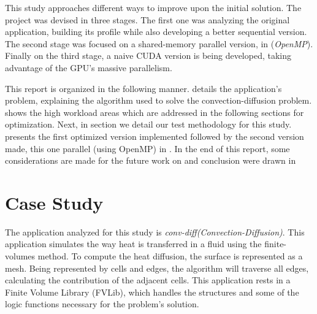 \documentclass[a4paper,10pt,openright,openbib,twocolumn]{article}
\begin{document}
This study approaches different ways to improve upon the initial solution. The project was devised in three stages. The first one was analyzing the original application, building its profile while also developing a better sequential version. The second stage was focused on a shared-memory parallel version, in (\emph{OpenMP}). Finally on the third stage, a naive CUDA version is being developed, taking advantage of the GPU's massive parallelism.

This report is organized in the following manner.  details the application's problem, explaining the algorithm used to solve the convection-diffusion problem.  shows the high workload areas which are addressed in the following sections for optimization. Next, in section  we detail our test methodology for this study.   presents the first optimized version implemented followed by the second version made, this one parallel (using OpenMP) in . In the end of this report, some considerations are made for the future work on  and conclusion were drawn in 

\section{Case Study}    %
\label{sec:casestudy}
The application analyzed for this study is \emph{conv-diff(Convection-Diffusion)}. This application simulates the way heat is transferred in a fluid using the finite-volumes method. To compute the heat diffusion, the surface is represented as a mesh. Being represented by cells and edges, the algorithm will traverse all edges, calculating the contribution of the adjacent cells. This application rests in a Finite Volume Library (FVLib), which handles the structures and some of the logic functions necessary for the problem's solution. 
\end{document}
